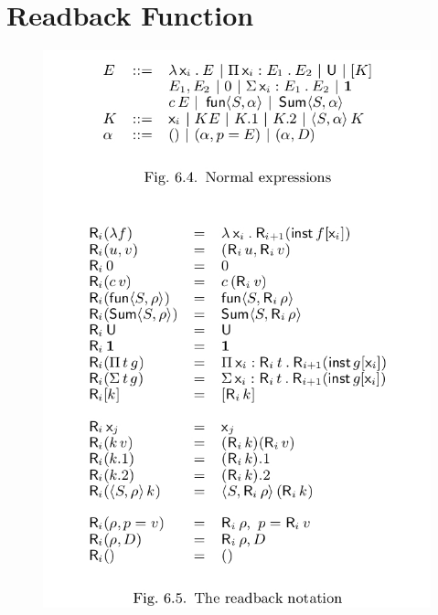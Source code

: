 \documentclass{article}
\begin{document}
\section{Readback Function}
\begin{figure}[h]
  \includegraphics[scale=0.4]{readback_minitt}
  \centering
\end{figure}
\end{document}

